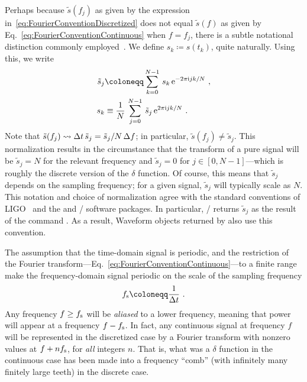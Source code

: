 \documentclass[aps, prd, amsfonts, amssymb, amsmath, %
nofootinbib]{revtex4}
\begin{document}
Perhaps because $\tilde{s}(f_{j})$ as given by the expression
in~\eqref{eq:FourierConventionDiscretized} does not equal
$\tilde{s}(f)$ as given by Eq.~\eqref{eq:FourierConventionContinuous}
when $f=f_{j}$, there is a subtle notational distinction commonly
employed~\cite{Brown2004}.  We define $s_{k}\coloneqq s(t_{k})$, quite
naturally.  Using this, we write
\begin{align}
  \label{eq:FourierConventionDiscrete}
  \tilde{s}_{j} & \coloneqq \sum_{k=0}^{N-1}\, s_{k}\, \e^{-2 \pi \i j
    k / N}\ ,
  \\
  \label{eq:FourierConventionDiscreteInverse}
  s_{k} &\equiv \frac{1}{N}\, \sum_{j=0}^{N-1}\, \tilde{s}_{j}\, \e^{2
    \pi \i j k / N}\ .
\end{align}
Note that $\tilde{s}(f_{j}) \rightsquigarrow \Delta t\, \tilde{s}_{j} =
\tilde{s}_{j} / N\, \Delta f$; in particular, $\tilde{s}(f_{j}) \neq
\tilde{s}_{j}$.  This normalization results in the circumstance that
the transform of a pure signal will be $\tilde{s}_{j} = N$ for the
relevant frequency and $\tilde{s}_{j} = 0$ for $j \in [0,
N-1]$---which is roughly the discrete version of the $\delta$
function.  Of course, this means that $\tilde{s}_{j}$ depends on the
sampling frequency; for a given signal, $\tilde{s}_{j}$ will typically
scale as $N$.  This notation and choice of normalization agree with
the standard conventions of LIGO~\cite{AndersonEtAl2001} and the
 and / software
packages.  In particular, / returns
$\tilde{s}_{j}$ as the result of the command .  As a
result, Waveform objects returned by  also use
this convention.

The assumption that the time-domain signal is periodic, and the
restriction of the Fourier
transform---Eq.~\eqref{eq:FourierConventionContinuous}---to a finite
range make the frequency-domain signal periodic on the scale of the
sampling frequency
\begin{equation}
  \label{eq:SamplingFrequency}
  \fsamp \coloneqq \frac{1}{\Delta t}\ .
\end{equation}
Any frequency $f \geq f_{\mathrm{s}}$ will be \emph{aliased} to a lower
frequency, meaning that power will appear at a frequency $f-f_{\mathrm{s}}$.
In fact, any continuous signal at frequency $f$ will be represented in
the discretized case by a Fourier transform with nonzero values at
$f+nf_{\mathrm{s}}$, for \emph{all} integers $n$.  That is, what was a
$\delta$ function in the continuous case has been made into a
frequency ``comb'' (with infinitely many finitely large teeth) in the
discrete case.
\end{document}
